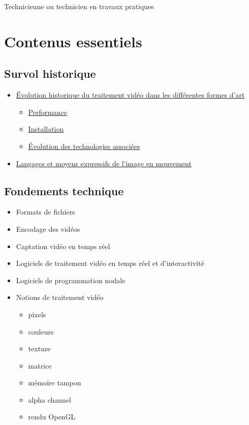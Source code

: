 \documentclass[
]{book}
\providecommand{\tightlist}{%
  \setlength{\itemsep}{0pt}\setlength{\parskip}{0pt}}
\begin{document}
Technicienne ou technicien en travaux pratiques

\hypertarget{contenus_essentiels}{%
\section{Contenus essentiels}\label{contenus_essentiels}}

\hypertarget{survol-historique}{%
\subsection{Survol historique}\label{survol-historique}}

\begin{itemize}
\tightlist
\item
  \protect\hyperlink{evolution_historique}{Évolution historique du traitement vidéo dans les différentes formes d'art}

  \begin{itemize}
  \tightlist
  \item
    \protect\hyperlink{evolution_historique_performance}{Performance}
  \item
    \protect\hyperlink{evolution_historique_installation}{Installation}
  \item
    \protect\hyperlink{evolution_historique_technologies}{Évolution des technologies associées}
  \end{itemize}
\item
  \protect\hyperlink{evolution_historique_language}{Langages et moyens expressifs de l'image en mouvement}
\end{itemize}

\hypertarget{fondements-technique}{%
\subsection{Fondements technique}\label{fondements-technique}}

\begin{itemize}
\tightlist
\item
  Formats de fichiers
\item
  Encodage des vidéos\\
\item
  Captation vidéo en temps réel
\item
  Logiciels de traitement vidéo en temps réel et d'interactivité
\item
  Logiciels de programmation nodale
\item
  Notions de traitement vidéo

  \begin{itemize}
  \tightlist
  \item
    pixels
  \item
    couleurs
  \item
    texture
  \item
    matrice
  \item
    mémoire tampon
  \item
    alpha channel
  \item
    rendu OpenGL
  \end{itemize}
\end{itemize}
\end{document}

